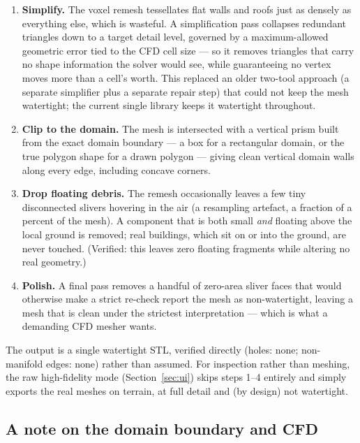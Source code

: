 \documentclass[11pt]{article}
\begin{document}
\begin{enumerate}[leftmargin=1.4cm]
  \item \textbf{Simplify.} The voxel remesh tessellates flat walls and roofs just as densely as
    everything else, which is wasteful. A simplification pass collapses redundant triangles down
    to a target detail level, governed by a maximum-allowed geometric error tied to the CFD cell
    size --- so it removes triangles that carry no shape information the solver would see, while
    guaranteeing no vertex moves more than a cell's worth. This replaced an older two-tool
    approach (a separate simplifier plus a separate repair step) that could not keep the mesh
    watertight; the current single library keeps it watertight throughout.
  \item \textbf{Clip to the domain.} The mesh is intersected with a vertical prism built from the
    exact domain boundary --- a box for a rectangular domain, or the true polygon shape for a
    drawn polygon --- giving clean vertical domain walls along every edge, including concave
    corners.
  \item \textbf{Drop floating debris.} The remesh occasionally leaves a few tiny disconnected
    slivers hovering in the air (a resampling artefact, a fraction of a percent of the mesh).
    A component that is both small \emph{and} floating above the local ground is removed;
    real buildings, which sit on or into the ground, are never touched. (Verified: this leaves
    zero floating fragments while altering no real geometry.)
  \item \textbf{Polish.} A final pass removes a handful of zero-area sliver faces that would
    otherwise make a strict re-check report the mesh as non-watertight, leaving a mesh that is
    clean under the strictest interpretation --- which is what a demanding CFD mesher wants.
\end{enumerate}

The output is a single watertight STL, verified directly (holes: none; non-manifold edges: none)
rather than assumed. For inspection rather than meshing, the raw high-fidelity mode
(Section~\ref{sec:ui}) skips steps 1--4 entirely and simply exports the real meshes on terrain,
at full detail and (by design) not watertight.

\subsection{A note on the domain boundary and CFD}
\end{document}

